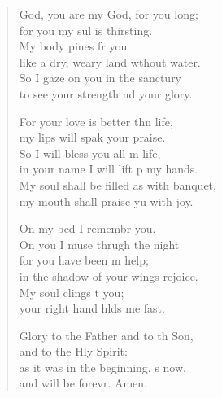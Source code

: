 \settowidth{\versewidth}{My soul shall be filled as with a banquet, *}
\begin{verse}%
  \begin{patverse}
     God, you are my God, for you  long;\Med\\
for you my sul is thirsting.\\
My body pines fr you\Med\\
like a dry, weary land wthout water.\\
So I gaze on you in the sanctury\Med\\
to see your strength nd your glory.

For your love is better thn life,\Med\\
my lips will spak your praise.\\
So I will bless you all m life,\Med\\
in your name I will lift p my hands.\\
My soul shall be filled as with  banquet,\Med\\
my mouth shall praise yu with joy.

On my bed I remembr you.\Med\\
On you I muse thrugh the night\\
for you have been m help;\Med\\
in the shadow of your wings  rejoice.\\
My soul clings t you;\Med\\
your right hand hlds me fast.

Glory to the Father and to th Son,\Med\\
and to the Hly Spirit:\\
as it was in the beginning, \pointup{\i}s now,\Med\\
and will be forevr. Amen.
  \end{patverse}
\end{verse}
